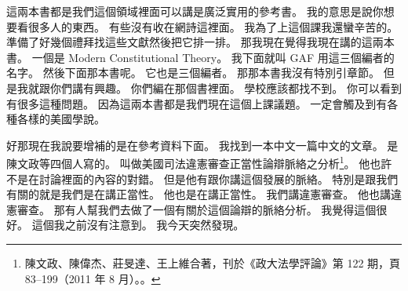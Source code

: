 \hypertarget{w01:cue:3}{}這兩本書都是我們這個領域裡面可以講是廣泛實用的參考書。
\hypertarget{w01:cue:4}{}我的意思是說你想要看很多人的東西。
\hypertarget{w01:cue:5}{}有些沒有收在網詩這裡面。
\hypertarget{w01:cue:6}{}我為了上這個課我還蠻辛苦的。
\hypertarget{w01:cue:7}{}準備了好幾個禮拜找這些文獻然後把它排一排。
\hypertarget{w01:cue:8}{}那我現在覺得我現在講的這兩本書。
\hypertarget{w01:cue:9}{}一個是 Modern Constitutional Theory。
\hypertarget{w01:cue:10}{}我下面就叫 GAF 用這三個編者的名字。
\hypertarget{w01:cue:11}{}然後下面那本書呢。
\hypertarget{w01:cue:12}{}它也是三個編者。
\hypertarget{w01:cue:13}{}那那本書我沒有特別引章節。
\hypertarget{w01:cue:14}{}但是我就跟你們講有興趣。
\hypertarget{w01:cue:15}{}你們編在那個書裡面。
\hypertarget{w01:cue:16}{}學校應該都找不到。
\hypertarget{w01:cue:17}{}你可以看到有很多這種問題。
\hypertarget{w01:cue:18}{}因為這兩本書都是我們現在這個上課議題。
\hypertarget{w01:cue:19}{}一定會觸及到有各種各樣的美國學說。

\hypertarget{w01:cue:20}{}好那現在我說要增補的是在參考資料下面。
\hypertarget{w01:cue:21}{}我找到一本中文一篇中文的文章。
\hypertarget{w01:cue:22}{}是陳文政等四個人寫的。
\hypertarget{w01:cue:23}{}叫做美國司法違憲審查正當性論辯脈絡之分析\footnote{陳文政、陳偉杰、莊旻達、王上維合著，刊於《政大法學評論》第 122 期，頁 83–199（2011 年 8 月）。\cite{chen2011}。}。
\hypertarget{w01:cue:24}{}他也許不是在討論裡面的內容的對錯。
\hypertarget{w01:cue:25}{}但是他有跟你講這個發展的脈絡。
\hypertarget{w01:cue:26}{}特別是跟我們有關的就是我們是在講正當性。
\hypertarget{w01:cue:27}{}他也是在講正當性。
\hypertarget{w01:cue:28}{}我們講違憲審查。
\hypertarget{w01:cue:29}{}他也講違憲審查。
\hypertarget{w01:cue:30}{}那有人幫我們去做了一個有關於這個論辯的脈絡分析。
\hypertarget{w01:cue:31}{}我覺得這個很好。
\hypertarget{w01:cue:32}{}這個我之前沒有注意到。
\hypertarget{w01:cue:33}{}我今天突然發現。

